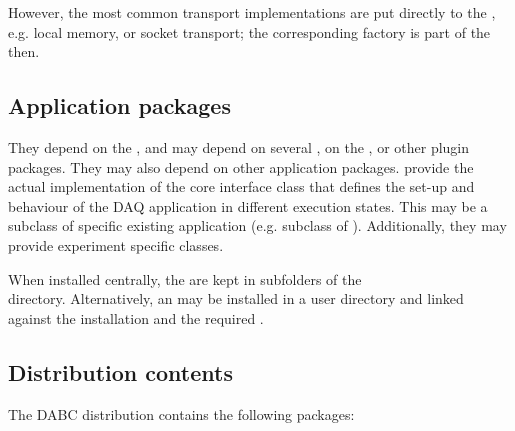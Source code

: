    However, the most common transport implementations are put 
   directly to the , e.g. local memory, or 
   socket transport; the corresponding factory is part of the  then. 
 
\subsection{Application packages}
They depend on the , and may depend 
on several , on the , or other plugin packages. 
They may also depend on other application packages. 
 provide the actual implementation of the core interface class
 that defines the set-up and behaviour of the DAQ application in 
different execution states. This may be a subclass of specific existing 
application (e.g. subclass of ). 
Additionally, they may provide experiment specific  classes.

When installed centrally, the  are kept in subfolders of the \\  
 directory. Alternatively, an  may be installed in a user directory and linked against the  installation and the required .


     
\subsection{Distribution contents}
The DABC distribution contains the following packages:

